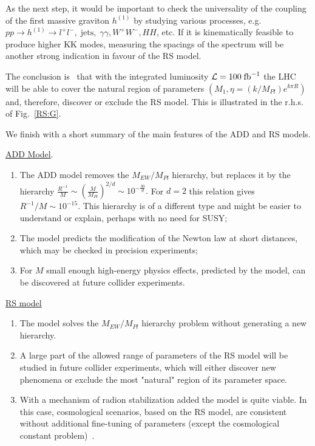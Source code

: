 \documentclass{cernyrep}
\begin{document}
As the next step, it would be important to check the universality of
the coupling of the first massive graviton $h^{(1)}$ by studying
various processes, e.g. $pp \rightarrow h^{(1)} \rightarrow
l^{+}l^{-}, \; \mbox{jets}, \; \gamma \gamma, W^{+}W^{-}, HH$,
etc. If it is kinematically feasible to produce higher KK modes,
measuring the spacings of the spectrum will be another strong
indication in favour of the RS model.

The conclusion is~\cite{DHR}  that with the integrated luminosity
${\cal L} = 100 \; \mbox{fb}^{-1}$ the LHC will be able to cover
the natural region of parameters $(M_{1},\eta = (k/M_{Pl}) e^{k\pi
R})$ and, therefore, discover or exclude the RS model. This is
illustrated in the r.h.s. of  Fig.~\ref{RS:G}.


We finish  with a short summary of the main features of the ADD
and RS models.

\underline{ADD Model}.

\begin{enumerate}
\item The ADD model removes the $M_{EW}/M_{Pl}$ hierarchy, but replaces
it by the hierarchy
$
\frac{R^{-1}}{M} \sim \left( \frac{M}{M_{Pl}} \right)^{2/d} \sim
10^{-\frac{30}{d}}.
$
For $d=2$ this relation gives $R^{-1}/M \sim 10^{-15}$. This
hierarchy is of a different type and might be easier to understand
or explain, perhaps with no need for SUSY;
\item The model predicts the modification of the Newton law at
short distances, which may be checked in precision experiments;
\item For $M$ small enough high-energy physics effects,
predicted by the model, can be discovered at future collider
experiments.
\end{enumerate}

\underline{RS model}

\begin{enumerate}
\item The model solves the $M_{EW}/M_{Pl}$ hierarchy problem
without generating a new hierarchy.

\item A large part of the allowed range of parameters
of the RS model will be studied in future collider experiments,
which will either discover new phenomena or exclude the most
"natural" region of its parameter space.

\item With a mechanism of radion stabilization added the model is quite
viable. In this case, cosmological scenarios, based on the RS
model, are consistent without additional fine-tuning of parameters
(except the cosmological constant problem)~\cite{Cosmoed}.
\end{enumerate}
\end{document}
